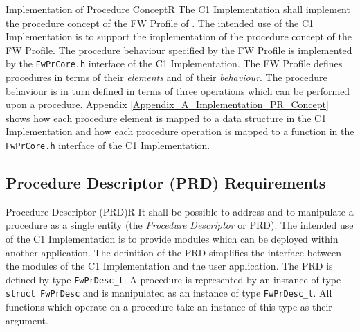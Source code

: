 \documentclass[requirements]{../fwprofile}
\begin{document}
\begin{fw_req}{Implementation of Procedure Concept}{R}
{The C1 Implementation shall implement the procedure concept of 
the FW Profile of \cite{ref:fwprofile}.}
{The intended use of the C1 Implementation is to support the 
implementation of the procedure concept of the FW Profile.}
{The procedure behaviour specified by the FW Profile is implemented by 
the \texttt{FwPrCore.h} interface of the C1 Implementation.} 
{The FW Profile defines procedures in terms of their \emph{elements} 
and of their \emph{behaviour}. 
The procedure behaviour is in turn defined in terms of three operations which can be performed 
upon a procedure. 
Appendix \ref{Appendix_A_Implementation_PR_Concept} shows how each procedure element is mapped to a data structure in the C1 Implementation and how each procedure operation is mapped to a 
function in the \texttt{FwPrCore.h} interface of the C1 Implementation.}
\end{fw_req}


\subsection{Procedure Descriptor (PRD) Requirements}\label{req:PRD}

\begin{fw_req}{Procedure Descriptor (PRD)}{R}
{It shall be possible to address and to manipulate a procedure as a 
single entity (the \emph{Procedure Descriptor} or PRD).}
{The intended use of the C1 Implementation is to provide modules which 
can be deployed within another application. 
The definition of the PRD simplifies the interface between the modules of the C1 Implementation 
and the user application.}
{The PRD is defined by type \texttt{FwPrDesc\_t}.} 
{A procedure is represented by an instance of type \texttt{struct FwPrDesc} 
and is manipulated as an instance of type \texttt{FwPrDesc\_t}. 
All functions which operate on a procedure take an instance of this type as their argument.}
\end{fw_req}
\end{document}

